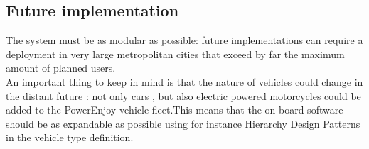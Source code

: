 \documentclass[12pt]{article}
\begin{document}
	\subsection{Future implementation}
	The system must be as modular as possible: future implementations can require a deployment in very large metropolitan cities that exceed by far the maximum amount of planned users.\\ An important thing to keep in mind is that the nature of vehicles could change in the distant future : not only cars , but also electric powered motorcycles could be added to the PowerEnjoy vehicle fleet.This means that the on-board software should be as expandable as possible using for instance Hierarchy Design Patterns in the vehicle type definition.
	 



	 	 


	 	
	
	 
     
    
     
	
\end{document}
